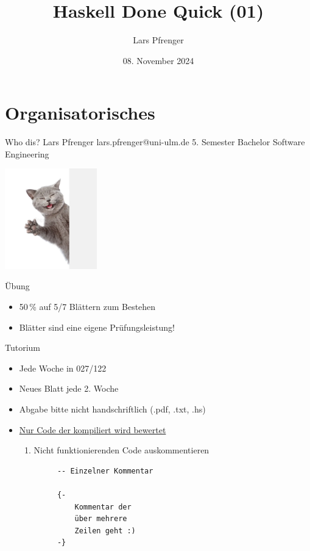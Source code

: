 \documentclass[
	aspectratio=169, 
	10pt 
]{beamer}
\title{Haskell Done Quick (01)}
\author{Lars Pfrenger}
\date{08. November 2024}
\begin{document}
\maketitle

\section{Organisatorisches}
\begin{frame}{Who dis?}
	\faAt \mbox{} Lars Pfrenger\break 
	\faEnvelope \mbox{} lars.pfrenger@uni-ulm.de\break
	\faGraduationCap \mbox{} 5. Semester Bachelor Software Engineering 
	
	\begin{flushright}
        \includegraphics[width=0.3\textwidth, trim={0 0 12.5cm 0}]{assets/hello.png} %
    \end{flushright}

\end{frame}


\begin{frame}{Übung}
	\begin{itemize}
		\item 50\,\% auf 5/7 Blättern zum Bestehen
		\item Blätter sind eine eigene Prüfungsleistung!
	\end{itemize}
\end{frame}

\begin{frame}[fragile]{Tutorium}
	\begin{fancycolumns}[T,widths={60,40}]
		\begin{itemize}
			\item Jede Woche in 027/122
			\item Neues Blatt jede 2. Woche
			\item Abgabe bitte nicht handschriftlich \break (.pdf, .txt, .hs)
			\item \underline{Nur Code der kompiliert wird bewertet} \begin{enumerate}[$\rightarrow$]
				\item Nicht funktionierenden Code auskommentieren
			\end{enumerate}
		\end{itemize}
		\nextcolumn
		\begin{verbatim}
			-- Einzelner Kommentar

			{- 
				Kommentar der
				über mehrere  
				Zeilen geht :)
			-}
		\end{verbatim}
	\end{fancycolumns}
\end{frame}
\end{document}
